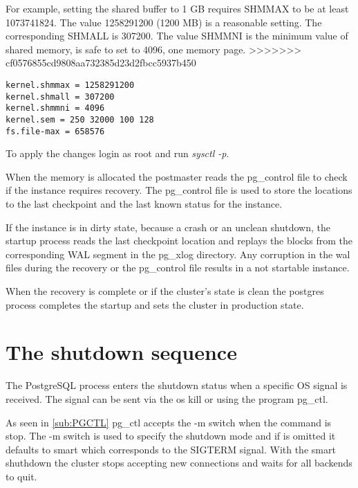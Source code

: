For example, setting the shared buffer to 1 GB requires SHMMAX to be at least 1073741824.
The value 1258291200 (1200 MB) is a reasonable setting. The corresponding SHMALL is 307200. The
value SHMMNI is the minimum value of shared memory, is safe to set to 4096, one memory page.
>>>>>>> cf0576855cd9808aa732385d23d2fbcc5937b450
\begin{verbatim}
kernel.shmmax = 1258291200
kernel.shmall = 307200
kernel.shmmni = 4096
kernel.sem = 250 32000 100 128
fs.file-max = 658576
\end{verbatim}

To apply the changes login as root and run \textit{sysctl -p}.\newline


When the memory is allocated the postmaster reads the pg\_control
file to check if the instance requires recovery. The pg\_control file is used to store the locations
to the last checkpoint and the last known status for the instance.\newline

If  the instance is in dirty state, because a crash or an unclean shutdown, the startup
process reads the last checkpoint location and replays the blocks from the corresponding WAL
segment in the pg\_xlog directory. Any corruption in the wal files during the recovery or the
pg\_control file results in a not startable instance.\newline

When the recovery is complete or if the cluster's state is clean the postgres process completes the
startup and sets the cluster in production state. 


\section{The shutdown sequence} 
\label{sec:SHUTDOWN_SEQ}

The PostgreSQL process enters the shutdown status when a specific OS signal is received. The signal
can be sent via the os kill or using the program pg\_ctl. \newline

As seen in \ref{sub:PGCTL} pg\_ctl accepts the -m switch when the command is stop. The -m switch
is used to specify the shutdown mode and if is omitted it defaults to smart which corresponds to
the SIGTERM signal. With the smart shuthdown the cluster stops accepting new connections and
waits for all backends to quit. \newline

